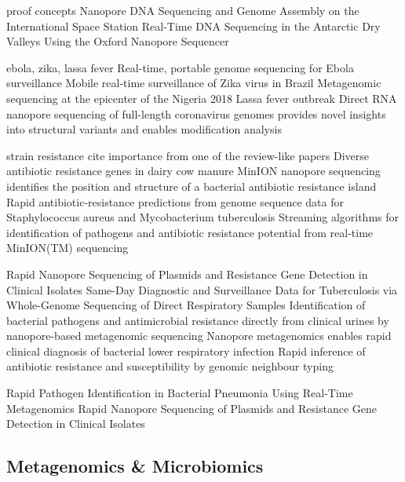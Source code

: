 proof concepts
Nanopore DNA Sequencing and Genome Assembly on the International Space Station \cite{Castro-Wallace2017}
Real-Time DNA Sequencing in the Antarctic Dry Valleys Using the Oxford Nanopore Sequencer \cite{Johnson2017}

ebola, zika, lassa fever
Real-time, portable genome sequencing for Ebola surveillance \cite{Quick2016}
Mobile real-time surveillance of Zika virus in Brazil \cite{Faria2016}
Metagenomic sequencing at the epicenter of the Nigeria 2018 Lassa fever outbreak \cite{Kafetzopoulou2019}
Direct RNA nanopore sequencing of full-length coronavirus genomes provides novel insights into structural variants and enables modification analysis \cite{Viehweger2019}

strain resistance
cite importance from one of the review-like papers
Diverse antibiotic resistance genes in dairy cow manure \cite{Wichmann2014}
MinION nanopore sequencing identifies the position and structure of a bacterial antibiotic resistance island \cite{Ashton2015}
Rapid antibiotic-resistance predictions from genome sequence data for Staphylococcus aureus and Mycobacterium tuberculosis \cite{Bradley2015}
Streaming algorithms for identification of pathogens and antibiotic resistance potential from real-time MinION(TM) sequencing \cite{Cao2016}

Rapid Nanopore Sequencing of Plasmids and Resistance Gene Detection in Clinical Isolates \cite{Lemon2017}
Same-Day Diagnostic and Surveillance Data for Tuberculosis via Whole-Genome Sequencing of Direct Respiratory Samples \cite{Votintseva2017}
Identification of bacterial pathogens and antimicrobial resistance directly from clinical urines by nanopore-based metagenomic sequencing \cite{Schmidt2017}
Nanopore metagenomics enables rapid clinical diagnosis of bacterial lower respiratory infection \cite{Charalampous2019}
Rapid inference of antibiotic resistance and susceptibility by genomic neighbour typing \cite{Brinda2020}

Rapid Pathogen Identification in Bacterial Pneumonia Using Real-Time Metagenomics \cite{Pendleton2017}
Rapid Nanopore Sequencing of Plasmids and Resistance Gene Detection in Clinical Isolates \cite{Lemon2017}




\subsection{Metagenomics \& Microbiomics}
\label{subsec:state_of_art:metagenomics}

